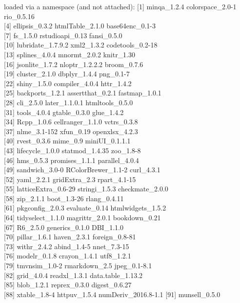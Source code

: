 \documentclass[
  english,
  man, noextraspace]{apa7}
\begin{document}
\begin{appendix}
loaded via a namespace (and not attached): {[}1{]} minqa\_1.2.4
colorspace\_2.0-1 rio\_0.5.16\\
{[}4{]} ellipsis\_0.3.2 htmlTable\_2.1.0 base64enc\_0.1-3\\
{[}7{]} fs\_1.5.0 rstudioapi\_0.13 fansi\_0.5.0\\
{[}10{]} lubridate\_1.7.9.2 xml2\_1.3.2 codetools\_0.2-18\\
{[}13{]} splines\_4.0.4 mnormt\_2.0.2 knitr\_1.30\\
{[}16{]} jsonlite\_1.7.2 nloptr\_1.2.2.2 broom\_0.7.6\\
{[}19{]} cluster\_2.1.0 dbplyr\_1.4.4 png\_0.1-7\\
{[}22{]} shiny\_1.5.0 compiler\_4.0.4 httr\_1.4.2\\
{[}25{]} backports\_1.2.1 assertthat\_0.2.1 fastmap\_1.0.1\\
{[}28{]} cli\_2.5.0 later\_1.1.0.1 htmltools\_0.5.0\\
{[}31{]} tools\_4.0.4 gtable\_0.3.0 glue\_1.4.2\\
{[}34{]} Rcpp\_1.0.6 cellranger\_1.1.0 vctrs\_0.3.8\\
{[}37{]} nlme\_3.1-152 xfun\_0.19 openxlsx\_4.2.3\\
{[}40{]} rvest\_0.3.6 mime\_0.9 miniUI\_0.1.1.1\\
{[}43{]} lifecycle\_1.0.0 statmod\_1.4.35 zoo\_1.8-8\\
{[}46{]} hms\_0.5.3 promises\_1.1.1 parallel\_4.0.4\\
{[}49{]} sandwich\_3.0-0 RColorBrewer\_1.1-2 curl\_4.3.1\\
{[}52{]} yaml\_2.2.1 gridExtra\_2.3 rpart\_4.1-15\\
{[}55{]} latticeExtra\_0.6-29 stringi\_1.5.3 checkmate\_2.0.0\\
{[}58{]} zip\_2.1.1 boot\_1.3-26 rlang\_0.4.11\\
{[}61{]} pkgconfig\_2.0.3 evaluate\_0.14 htmlwidgets\_1.5.2\\
{[}64{]} tidyselect\_1.1.0 magrittr\_2.0.1 bookdown\_0.21\\
{[}67{]} R6\_2.5.0 generics\_0.1.0 DBI\_1.1.0\\
{[}70{]} pillar\_1.6.1 haven\_2.3.1 foreign\_0.8-81\\
{[}73{]} withr\_2.4.2 abind\_1.4-5 nnet\_7.3-15\\
{[}76{]} modelr\_0.1.8 crayon\_1.4.1 utf8\_1.2.1\\
{[}79{]} tmvnsim\_1.0-2 rmarkdown\_2.5 jpeg\_0.1-8.1\\
{[}82{]} grid\_4.0.4 readxl\_1.3.1 data.table\_1.13.2\\
{[}85{]} blob\_1.2.1 reprex\_0.3.0 digest\_0.6.27\\
{[}88{]} xtable\_1.8-4 httpuv\_1.5.4 numDeriv\_2016.8-1.1 {[}91{]}
munsell\_0.5.0


\end{appendix}
\end{document}
